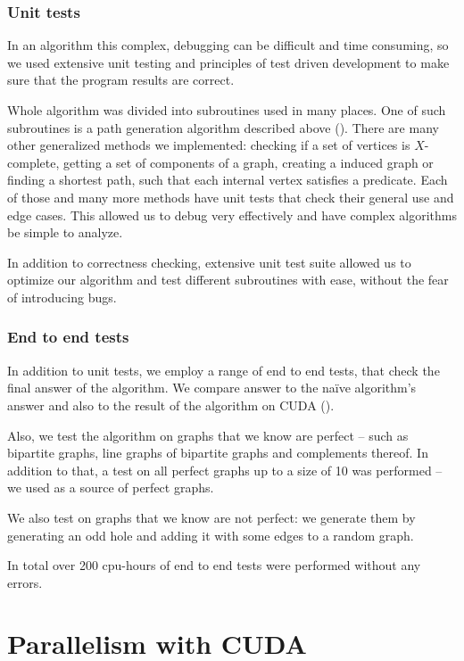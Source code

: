 \subsubsection{Unit tests}

In an algorithm this complex, debugging can be difficult and time consuming, so we used extensive unit testing and principles of test driven development to make sure that the program results are correct.

Whole algorithm was divided into subroutines used in many places. One of such subroutines is a path generation algorithm described above (). There are many other generalized methods we implemented: checking if a set of vertices is $X$-complete, getting a set of components of a graph, creating a induced graph or finding a shortest path, such that each internal vertex satisfies a predicate. Each of those and many more methods have unit tests that check their general use and edge cases. This allowed us to debug very effectively and have complex algorithms be simple to analyze.

In addition to correctness checking, extensive unit test suite allowed us to optimize our algorithm and test different subroutines with ease, without the fear of introducing bugs.

\subsubsection{End to end tests}

In addition to unit tests, we employ a range of end to end tests, that check the final answer of the algorithm. We compare answer to the na\"ive algorithm's answer and also to the result of the algorithm on CUDA ().

Also, we test the algorithm on graphs that we know are perfect -- such as bipartite graphs, line graphs of bipartite graphs and complements thereof. In addition to that, a test on all perfect graphs up to a size of 10 was performed -- we used \cite{graphRepo} as a source of perfect graphs.

We also test on graphs that we know are not perfect: we generate them by generating an odd hole and adding it with some edges to a random graph.

In total over 200 cpu-hours of end to end tests were performed without any errors.

\section{Parallelism with CUDA}
\label{sec:CUDA}

